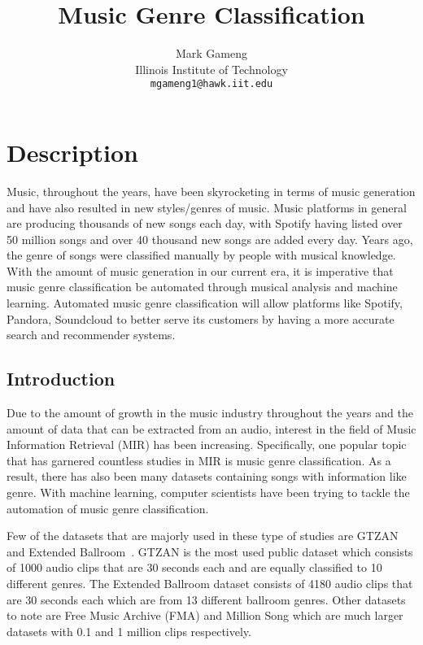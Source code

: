\documentclass[10pt,twocolumn,letterpaper]{article}
\begin{document}
	
	\title{Music Genre Classification}
	
	\author{Mark Gameng\\
		Illinois Institute of Technology\\
		{\tt\small mgameng1@hawk.iit.edu}
	}
	
	\maketitle
	
	\section{Description}
	
	Music, throughout the years, have been skyrocketing in terms of music generation and have also resulted in new styles/genres of music. Music platforms in general are producing thousands of new songs each day, with Spotify having listed over 50 million songs and over 40 thousand new songs are added every day. Years ago, the genre of songs were classified manually by people with musical knowledge. With the amount of music generation in our current era, it is imperative that music genre classification be automated through musical analysis and machine learning. Automated music genre classification will allow platforms like Spotify, Pandora, Soundcloud to better serve its customers by having a more accurate search and recommender systems.
	
	\subsection{Introduction}
	
	Due to the amount of growth in the music industry throughout the years and the amount of data that can be extracted from an audio, interest in the field of Music Information Retrieval (MIR) has been increasing. Specifically, one popular topic that has garnered countless studies in MIR is music genre classification. As a result, there has also been many datasets containing songs with information like genre. With machine learning, computer scientists have been trying to tackle the automation of music genre classification.
	
	Few of the datasets that are majorly used in these type of studies are GTZAN~\cite{tzanetakis2002musical} and Extended Ballroom~\cite{marchand2016extended}. GTZAN is the most used public dataset which consists of 1000 audio clips that are 30 seconds each and are equally classified to 10 different genres. The Extended Ballroom dataset consists of 4180 audio clips that are 30 seconds each which are from 13 different ballroom genres. Other datasets to note are Free Music Archive (FMA) and Million Song which are much larger datasets with 0.1 and 1 million clips respectively.
	
\end{document}
